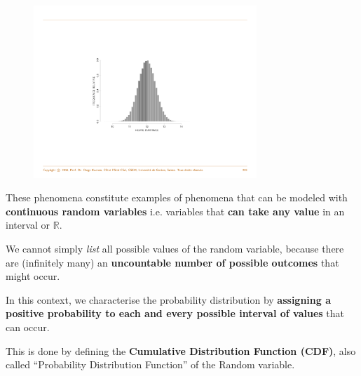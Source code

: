 \documentclass[notes=show,smaller]{beamer}\usepackage[]{graphicx}\usepackage[]{color}
\begin{document}
\begin{frame}{\secname}
  \begin{example}[continued]
  \begin{figure}
  \includegraphics[width=0.75\textwidth,height=0.75\textheight]{img/hist3.pdf}
  \end{figure}
  \end{example}
\end{frame}


%
%
%


\begin{frame}{\secname}
  These phenomena constitute examples of phenomena that can be modeled with
  \textbf{continuous random variables} i.e.
  variables that \textbf{can take any value} in an interval or $\mathbb{R}$. \\ \bigskip

  We cannot simply \emph{list} all possible values of the
  random variable, because there are (infinitely many) an
  \textbf{uncountable number of possible outcomes} that might occur. \\ \bigskip

  In this context, we characterise the probability distribution by  \textbf{assigning a positive probability to each and every possible interval of values} that can occur. \\ \bigskip

  This is done by defining the \textbf{Cumulative Distribution Function (CDF)}, also called ``Probability Distribution Function'' of the Random variable.
\end{frame}
\end{document}
